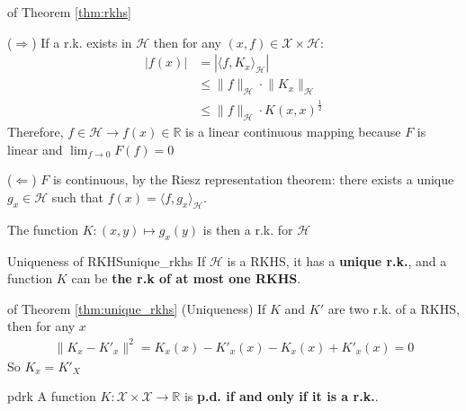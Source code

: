 \documentclass{article}
\begin{document}
\begin{Proof}{of Theorem \ref{thm:rkhs}}{}
  
  
  ($\Rightarrow$) If a r.k. exists in $\mathcal{H}$ then for any $(x,f) \in 
  \mathcal{X} \times \mathcal{H}$:
  \begin{align*}
    |f(x)| &= |\langle f, K_x \rangle_\mathcal{H} |\\
           &\leq \lVert f \rVert_\mathcal{H} \cdot \lVert K_x \rVert_\mathcal{H}
           \tag{Cauchy-Schwarz}\\
           &\leq \lVert f \rVert_\mathcal{H} \cdot K(x,x)^\frac{1}{2}
  \end{align*}
  Therefore, $f\in\mathcal{H} \rightarrow f(x) \in \mathbb{R}$ is a linear 
  continuous mapping because $F$ is linear and $\lim_{f\rightarrow 0} F(f)= 0$

  \vspace{10pt}
  ($\Leftarrow$) $F$ is continuous, by the Riesz representation theorem: there
  exists a unique $g_x \in \mathcal{H}$ such that $f(x) = \langle f, g_x 
  \rangle_\mathcal{H}$.

  The function $K: (x, y) \mapsto g_x(y)$ is then a r.k. for $\mathcal{H}$
\end{Proof}

\begin{Theorem}{Uniqueness of RKHS}{unique_rkhs}
  If $\mathcal{H}$ is a RKHS, it has a \textbf{unique r.k.}, and a function $K$
  can be \textbf{the r.k of at most one RKHS}.
\end{Theorem}

\begin{Proof}{of Theorem \ref{thm:unique_rkhs}}{}
  (Uniqueness) If $K$ and $K'$ are two r.k. of a RKHS, then for any $x$
  \begin{align*}
    \lVert K_x - K'_x\rVert^2 = K_x(x) - K'_x(x) - K_x(x) + K'_x(x) = 0
  \end{align*}
  So $K_x = K'_X$

\end{Proof}

\begin{Theorem}{}{pdrk}
  A function $K : \mathcal{X} \times \mathcal{X} \rightarrow \mathbb{R}$ is 
  \textbf{p.d. if and only if it is a r.k.}.
\end{Theorem}
\end{document}
